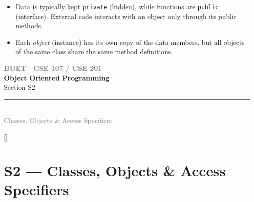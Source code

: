 \documentclass[12pt,a3paper]{article}
\newcommand{\secdivider}[4]{%
  \newpage\thispagestyle{empty}%
  \vspace*{\fill}%
  \begin{tcolorbox}[enhanced,colback=#4!7,colframe=#3,boxrule=1.5pt,arc=8pt,
    left=20pt,right=20pt,top=22pt,bottom=22pt,
    shadow={3pt}{-3pt}{0pt}{black!15}]
    \centering
    {\large\textcolor{gray}{\textbf{BUET $\cdot$ CSE 107 / CSE 201}}}\\[8pt]
    {\fontsize{26}{32}\selectfont\bfseries\textcolor{#3}{Object Oriented Programming}}\\[6pt]
    {\fontsize{15}{19}\selectfont\textcolor{dgray}{#1}}\\[12pt]
    \textcolor{#3!60}{\rule{0.5\textwidth}{0.5pt}}\\[6pt]
    {\small\textcolor{gray}{#2}}
  \end{tcolorbox}%
  \vspace*{\fill}\newpage%
}
\begin{document}
\begin{enumerate}
\begin{tcolorbox}[enhanced,breakable,ansbox,colback=cA!4,colframe=cA,
  boxrule=0.8pt,arc=5pt,
  title={\textbf{Answer}},fonttitle=\bfseries\color{white},colbacktitle=cA]
\begin{itemize}[itemsep=3pt]
  \item Data is typically kept \texttt{private} (hidden), while
    functions are \texttt{public} (interface).  External code
    interacts with an object only through its public methods.

  \item Each \emph{object} (instance) has its own copy of the data
    members, but all objects of the same class share the same method
    definitions.
\end{itemize}

\end{tcolorbox}


\end{enumerate}
\newpage

\secdivider{Section S2}{Classes, Objects \& Access Specifiers}{cB}{cB}
\label{sec:S2}
\titleformat{\section}{\large\bfseries\color{cB}}{}{0em}{}[\titlerule]
\section{S2 --- Classes, Objects \& Access Specifiers}
\end{document}
